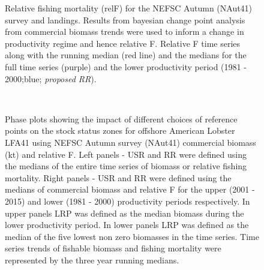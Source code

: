 \documentclass[11pt]{article}
\newcommand{\e}{/backup/bio_data/bio.lobster/figures/} %
\begin{document}
\begin{figure}
\centering
       \caption{Relative fishing mortality (relF) for the NEFSC Autumn (NAut41) survey and landings. Results from bayesian change point analysis from commercial biomass trends were used to inform a change in productivity regime and hence relative F. Relative F time series along with the running median (red line) and the medians for the full time series (purple) and the lower productivity period (1981 - 2000;blue; \emph{proposed RR}). }
\end{figure}


\begin{landscape}
\begin{figure}
\centering
        \\
      

      \caption{Phase plots showing the impact of different choices of reference points on the stock status zones for offshore American Lobster LFA41 using NEFSC Autumn survey (NAut41) commercial biomass (kt) and relative F. Left panels  - USR and RR were defined using the medians of the entire time series of biomass or relative fishing mortality. Right panels - USR and RR were defined using the medians of commercial biomass and relative F for the upper (2001 - 2015) and lower (1981 - 2000) productivity periods respectively. In upper panels LRP was defined as the median biomass during the lower productivity period. In lower panels LRP was defined as the median of the five lowest non zero biomasses in the time series. Time series trends of fishable biomass and fishing mortality were represented by the three year running medians. }

\end{figure}
\end{landscape}
\end{document}
